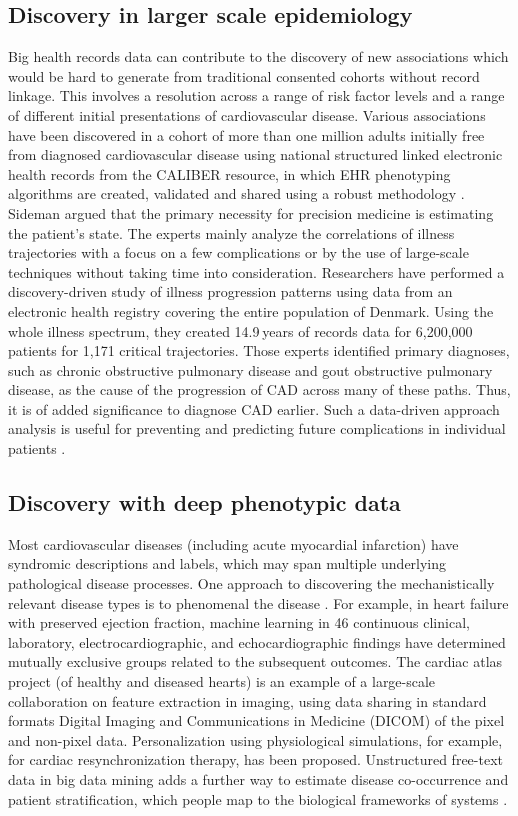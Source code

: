 \documentclass[sigconf]{acmart}
\begin{document}
\subsection{Discovery in larger scale epidemiology}
Big health records data can contribute to the discovery of new associations which would be hard to generate from traditional consented cohorts without record linkage.
 This involves a resolution across a range of risk factor levels and a range of different initial presentations of cardiovascular disease.
Various associations have been  discovered in a cohort of  more than one million adults initially free from diagnosed cardiovascular disease using national structured linked electronic health records from the CALIBER resource, in which EHR phenotyping algorithms are created, validated and shared using a robust methodology \cite{wang2005framingham}.
Sideman \cite{sideman1985simulation} argued that the primary necessity for precision medicine is estimating the patient's state.
The experts mainly analyze the correlations of illness trajectories with a focus on a few complications or by the use of large-scale techniques without taking time into consideration.
Researchers have performed a discovery-driven study of illness progression patterns using data from an electronic health registry covering the entire population of Denmark.
Using the whole illness spectrum, they created 14.9 years of records data for 6,200,000 patients for 1,171 critical trajectories.  Those experts identified primary diagnoses, such as chronic obstructive pulmonary disease and gout obstructive pulmonary disease, as the cause of the progression of CAD across many of these paths. Thus, it is of added significance to diagnose CAD earlier.
Such a data-driven approach analysis is useful for preventing and predicting future complications in individual patients \cite{sideman1985simulation}.

\subsection{Discovery with deep phenotypic data}
Most cardiovascular diseases (including acute myocardial infarction) have syndromic descriptions and labels, which may span multiple underlying pathological disease processes.
One approach to discovering the mechanistically relevant disease types is to phenomenal  the disease \cite{sahaf2011comparing}.
For example, in heart failure with preserved ejection fraction, machine learning in 46 continuous clinical, laboratory, electrocardiographic, and echocardiographic findings have determined mutually exclusive groups related to the subsequent outcomes.
The cardiac atlas project (of healthy and diseased hearts) is an example of a large-scale collaboration on feature extraction in imaging, using data sharing in standard formats Digital Imaging and Communications in Medicine (DICOM) of the pixel and non-pixel data.
Personalization using physiological simulations, for example, for cardiac resynchronization therapy, has been proposed.
Unstructured free-text data in big data mining adds a further way to estimate disease co-occurrence and patient stratification, which people map to the biological frameworks of systems \cite{sahaf2011comparing}.
\end{document}
